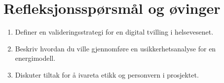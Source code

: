 \section{Refleksjonsspørsmål og øvinger}
\begin{enumerate}
    \item Definer en valideringsstrategi for en digital tvilling i helsevesenet.
    \item Beskriv hvordan du ville gjennomføre en usikkerhetsanalyse for en energimodell.
    \item Diskuter tiltak for å ivareta etikk og personvern i prosjektet.
\end{enumerate}
